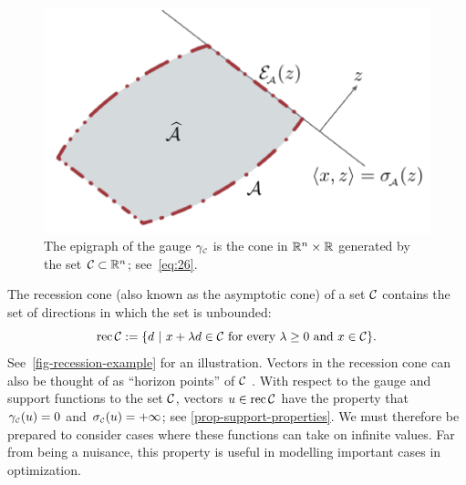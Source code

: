 \begin{figure}[t]
    \centering
    \includegraphics[page=7]{./figures/illustrations}
    \caption{The epigraph of the gauge $\gamma_{\scriptscriptstyle\mathcal{C}}$ is the cone in
      $\mathbb{R}^n\times\mathbb{R}$ generated by the set $\mathcal{C}\subset\mathbb{R}^n$; see~\eqref{eq:26}.}
    \label{fig:gauge-epi}
  \end{figure}

The recession cone (also known as the asymptotic cone) of a set $\mathcal{C}$ contains
the set of directions in which the set is unbounded:
\begin{equation} \label{eq-recession-cone}
  \operatorname{rec} \mathcal{C} :=
  \{d ~|~ \mbox{$x+\lambda d \in \mathcal{C}$ for every $\lambda\ge0$ and $x\in\mathcal{C}$}\}.
\end{equation}
See~\autoref{fig-recession-example} for an illustration.
Vectors in the recession cone can also be thought of as ``horizon
points'' of $\mathcal{C}$ \cite[p.~60]{rockafellar1970convex}. With respect
to the gauge and support functions to the set $\mathcal{C}$, vectors
$u\in\operatorname{rec}\mathcal{C}$ have the property that $\gamma_{\scriptscriptstyle\mathcal{C}}(u) = 0$ and
$\sigma_{\scriptscriptstyle\mathcal{C}}(u) = +\infty$; see \autoref{prop-support-properties}. We must
therefore be prepared to consider cases where these functions can take
on infinite values. Far from being a nuisance, this property is useful
in modelling important cases in optimization.

